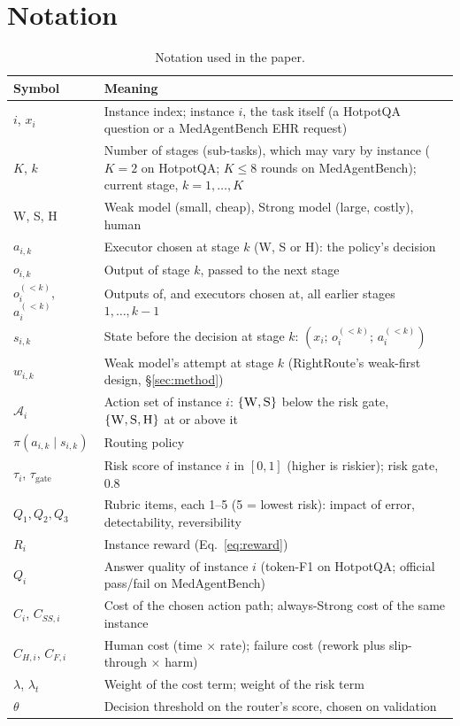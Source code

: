 \documentclass{article}
\newcommand{\W}{\textsc{W}}
\newcommand{\Sg}{\textsc{S}}
\newcommand{\Hm}{\textsc{H}}
\begin{document}
\section{Notation}
\label{app:notation}
\begin{table}[h]
\caption{Notation used in the paper.}
\label{tab:notation}
\centering\small
\begin{tabular}{@{}lp{10.6cm}@{}}
\toprule
Symbol & Meaning\\
\midrule
$i$, $x_i$ & Instance index; instance $i$, the task itself (a HotpotQA question or a MedAgentBench EHR request)\\
$K$, $k$ & Number of stages (sub-tasks), which may vary by instance ($K{=}2$ on HotpotQA; $K \le 8$ rounds on MedAgentBench); current stage, $k=1,\dots,K$\\
\W, \Sg, \Hm & Weak model (small, cheap), Strong model (large, costly), human\\
$a_{i,k}$ & Executor chosen at stage $k$ (\W, \Sg{} or \Hm): the policy's decision\\
$o_{i,k}$ & Output of stage $k$, passed to the next stage\\
$o_i^{(<k)}$, $a_i^{(<k)}$ & Outputs of, and executors chosen at, all earlier stages $1,\dots,k-1$\\
$s_{i,k}$ & State before the decision at stage $k$: $(x_i;\, o_i^{(<k)};\, a_i^{(<k)})$\\
$w_{i,k}$ & Weak model's attempt at stage $k$ (RightRoute's weak-first design, \S\ref{sec:method})\\
$\mathcal{A}_i$ & Action set of instance $i$: $\{\W,\Sg\}$ below the risk gate, $\{\W,\Sg,\Hm\}$ at or above it\\
$\pi(a_{i,k}\mid s_{i,k})$ & Routing policy\\
$\tau_i$, $\tau_{\text{gate}}$ & Risk score of instance $i$ in $[0,1]$ (higher is riskier); risk gate, $0.8$\\
$Q_1, Q_2, Q_3$ & Rubric items, each 1--5 (5 = lowest risk): impact of error, detectability, reversibility\\
$R_i$ & Instance reward (Eq.~\ref{eq:reward})\\
$Q_i$ & Answer quality of instance $i$ (token-F1 on HotpotQA; official pass/fail on MedAgentBench)\\
$C_i$, $C_{SS,i}$ & Cost of the chosen action path; always-Strong cost of the same instance\\
$C_{H,i}$, $C_{F,i}$ & Human cost (time $\times$ rate); failure cost (rework plus slip-through $\times$ harm)\\
$\lambda$, $\lambda_t$ & Weight of the cost term; weight of the risk term\\
$\theta$ & Decision threshold on the router's score, chosen on validation\\
\bottomrule
\end{tabular}
\end{table}
\end{document}
